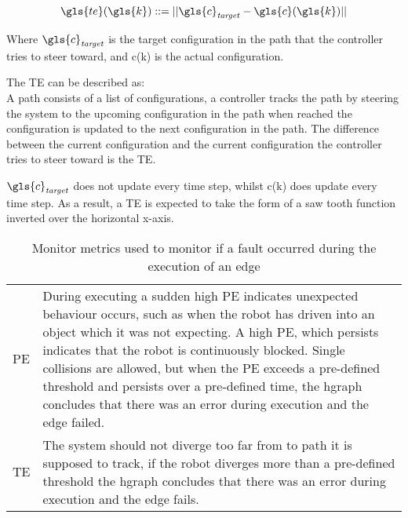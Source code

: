 \[ \gls{te}(\gls{k}) ::= ||\gls{c}_\mathit{target} - \gls{c}(\gls{k})|| \]

Where $\gls{c}_\mathit{target}$ is the target configuration in the path that the controller tries to steer toward, and \gls{c}(\gls{k}) is the actual configuration.\bs

The \ac{TE} can be described as:\\ A path consists of a list of configurations, a controller tracks the path by steering the system to the upcoming configuration in the path when reached the configuration is updated to the next configuration in the path. The difference between the current configuration and the current configuration the controller tries to steer toward is the \ac{TE}.\bs

$\gls{c}_\mathit{target}$ does not update every time step, whilst \gls{c}(\gls{k}) does update every time step. As a result, a  \ac{TE} is expected to take the form of a saw tooth function inverted over the horizontal x-axis.\bs

\noindent
\begin{table}[H]
\centering
\begin{tabular}%
  {>{\raggedleft\arraybackslash}p{}%
   >{\raggedright\arraybackslash}p{}}
\acf{PE}&  During executing a sudden high \ac{PE} indicates unexpected behaviour occurs, such as when the robot has driven into an object which it was not expecting. A high \ac{PE}, which persists indicates that the robot is continuously blocked. Single collisions are allowed, but when the \ac{PE} exceeds a pre-defined threshold and persists over a pre-defined time, the \ac{hgraph} concludes that there was an error during execution and the edge failed.\\
  \acf{TE}& The system should not diverge too far from to path it is supposed to track, if the robot diverges more than a pre-defined threshold the \ac{hgraph} concludes that there was an error during execution and the edge fails. \\
\end{tabular}
\caption{Monitor metrics used to monitor if a fault occurred during the execution of an edge}%
\label{table:monitoring_edge_metrics}
\end{table}
